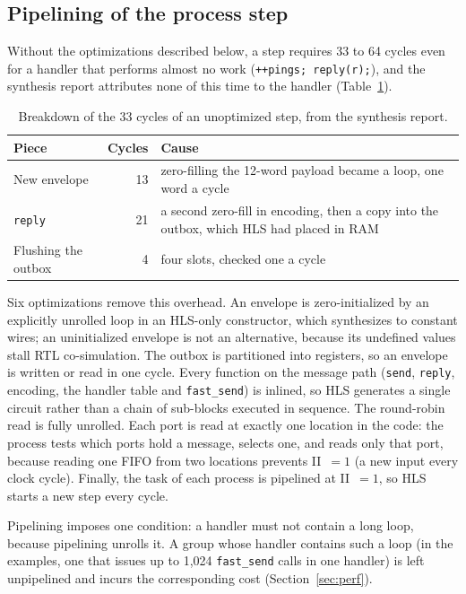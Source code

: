 \documentclass[11pt]{article}
\newcommand{\fs}{\texttt{fast\_send}}
\newcommand{\snd}{\texttt{send}}
\begin{document}
\subsection{Pipelining of the process step}
\label{sec:pipeline}

Without the optimizations described below, a step requires 33 to 64 cycles
even for a handler that performs almost no work (\texttt{++pings; reply(r);}),
and the synthesis report attributes none of this time to the handler
(Table~\ref{tab:cycles}).

\begin{table}[h]
\centering
\caption{Breakdown of the 33 cycles of an unoptimized step, from the synthesis
report.}
\label{tab:cycles}
\small
\begin{tabular}{p{3.2cm} r p{8.4cm}}
\toprule
Piece & Cycles & Cause \\
\midrule
New envelope & 13 & zero-filling the 12-word payload became a loop, one word a cycle \\
\texttt{reply} & 21 & a second zero-fill in encoding, then a copy into the outbox, which HLS had placed in RAM \\
Flushing the outbox & 4 & four slots, checked one a cycle \\
\bottomrule
\end{tabular}
\end{table}

Six optimizations remove this overhead. An envelope is zero-initialized by an
explicitly unrolled loop in an HLS-only constructor, which synthesizes to
constant wires; an uninitialized envelope is not an alternative, because its
undefined values stall RTL co-simulation. The outbox is partitioned into
registers, so an envelope is written or read in one cycle. Every function on
the message path (\snd{}, \texttt{reply}, encoding, the handler table and
\fs{}) is inlined, so HLS generates a single circuit rather than a chain of
sub-blocks executed in sequence. The round-robin read is fully unrolled. Each
port is read at exactly one location in the code: the process tests which
ports hold a message, selects one, and reads only that port, because reading
one FIFO from two locations prevents II~$=1$ (a new input every clock cycle). Finally, the task of each process
is pipelined at II~$=1$, so HLS starts a new step every cycle.

Pipelining imposes one condition: a handler must not contain a long loop,
because pipelining unrolls it. A group whose handler contains such a loop (in
the examples, one that issues up to 1{,}024 \fs{} calls in one handler) is left
unpipelined and incurs the corresponding cost (Section~\ref{sec:perf}).
\end{document}
